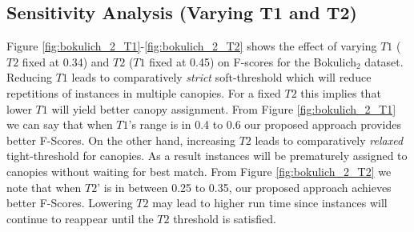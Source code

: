 \documentclass[10pt, conference, compsocconf]{IEEEtran}
\begin{document}
 

\subsection{\textbf{Sensitivity Analysis (Varying T1 and T2)}}
Figure \ref{fig:bokulich_2_T1}-\ref{fig:bokulich_2_T2} shows the 
effect of varying $T1$ ($T2$ fixed at 0.34) and $T2$ ($T1$ fixed at 0.45) on F-scores for the Bokulich$_2$ dataset. Reducing $T1$ leads to
comparatively \textit{strict} soft-threshold which will reduce 
repetitions of instances in multiple canopies. For a fixed $T2$ this implies that 
lower $T1$ will yield better canopy assignment. From Figure \ref{fig:bokulich_2_T1} we can say that 
when $T1$'s range is in 0.4 to 0.6 our proposed approach provides better 
F-Scores. On the other hand, increasing $T2$ leads to comparatively \textit{relaxed} tight-threshold for canopies. As a result instances will be prematurely assigned to canopies without waiting for best match. From Figure \ref{fig:bokulich_2_T2} we note that 
when $T2$'  is in between 0.25 to 0.35, 
our proposed approach achieves better F-Scores. Lowering 
$T2$ may lead to higher run time since instances will continue to reappear 
until the $T2$ threshold is satisfied.                   
\end{document}
